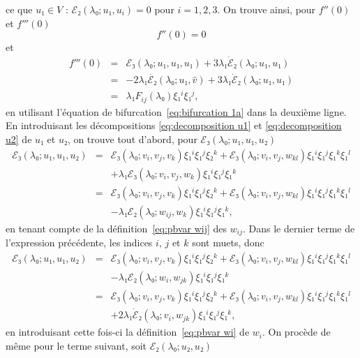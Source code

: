 \documentclass{article}
\begin{document}
ce que $u₁∈V$ : $ℰ₂ (λ₀ ; u₁, u_i) = 0$ pour $i = 1,
2, 3$. On trouve ainsi, pour $f'' (0)$ et $f''' (0)$
\begin{equation}
  \label{eq:DL energie derivee 2nde} f'' (0) = 0
\end{equation}
et
\begin{eqnarray}
  f''' (0) & = & ℰ₃ (λ₀ ; u₁, u₁, u₁) + 3 λ₁
  \dot{ℰ}₂ (λ₀ ; u₁, u₁) \nonumber\\
  & = & - 2 λ₁  \dot{ℰ₂} (λ₀ ; u₁, \hat{v}) + 3
  λ₁  \dot{ℰ}₂ (λ₀ ; u₁, u₁) \nonumber\\
  & = & λ₁ F_{i  j} (λ₀) ξ₁^i ξ₁^j,  \label{eq:DL
  energie derivee 3ieme}
\end{eqnarray}
en utilisant l'équation de bifurcation~\eqref{eq:bifurcation 1a} dans la
deuxième ligne. En introduisant les décompositions
\eqref{eq:decomposition u1} et \eqref{eq:decomposition u2} de $u₁$ et $u₂$,
on trouve tout d'abord, pour $ℰ₃ (λ₀ ; u₁, u₁, u₂)$
\begin{eqnarray*}
  ℰ₃ (λ₀ ; u₁, u₁, u₂) & = & ℰ₃ (λ₀ ;
  v_i, v_j, v_k) ξ₁^i ξ₁^j ξ₂^k +ℰ₃ (λ₀ ; v_i, v_j,
  w_{k  l}) ξ₁^i ξ₁^j ξ₁^k ξ₁^l\\
  &  &  + λ₁ ℰ₃ (λ₀ ; v_i, v_j, w_k)
  ξ₁^i ξ₁^j ξ₁^k\\
  & = & ℰ₃ (λ₀ ; v_i, v_j, v_k) ξ₁^i ξ₁^j ξ₂^k
  +ℰ₃ (λ₀ ; v_i, v_j, w_{k  l}) ξ₁^i ξ₁^j
  ξ₁^k ξ₁^l\\
  &  &  - λ₁ ℰ₂ (λ₀ ; w_{i  j},
  w_k) ξ₁^i ξ₁^j ξ₁^k,
\end{eqnarray*}
en tenant compte de la définition~\eqref{eq:pbvar wij} des $w_{i
j}$. Dans le dernier terme de l'expression précédente, les indices
$i$, $j$ et $k$ sont muets, donc
\begin{eqnarray*}
  ℰ₃ (λ₀ ; u₁, u₁, u₂) & = & ℰ₃ (λ₀ ;
  v_i, v_j, v_k) ξ₁^i ξ₁^j ξ₂^k +ℰ₃ (λ₀ ; v_i, v_j,
  w_{k  l}) ξ₁^i ξ₁^j ξ₁^k ξ₁^l\\
  &  &  - λ₁ ℰ₂ (λ₀ ; w_{i }, w_{j
   k}) ξ₁^i ξ₁^j ξ₁^k\\
  & = & ℰ₃ (λ₀ ; v_i, v_j, v_k) ξ₁^i ξ₁^j ξ₂^k
  +ℰ₃ (λ₀ ; v_i, v_j, w_{k  l}) ξ₁^i ξ₁^j
  ξ₁^k ξ₁^l\\
  &  &  + 2 λ₁  \dot{ℰ}₂ (λ₀ ; v_{i
  }, w_{j  k}) ξ₁^i ξ₁^j ξ₁^k,
\end{eqnarray*}
en introduisant cette fois-ci la définition~\eqref{eq:pbvar wi} de $w_i .$
On procède de même pour le terme suivant, soit $ℰ₂
(λ₀ ; u₂, u₂)$
\end{document}
